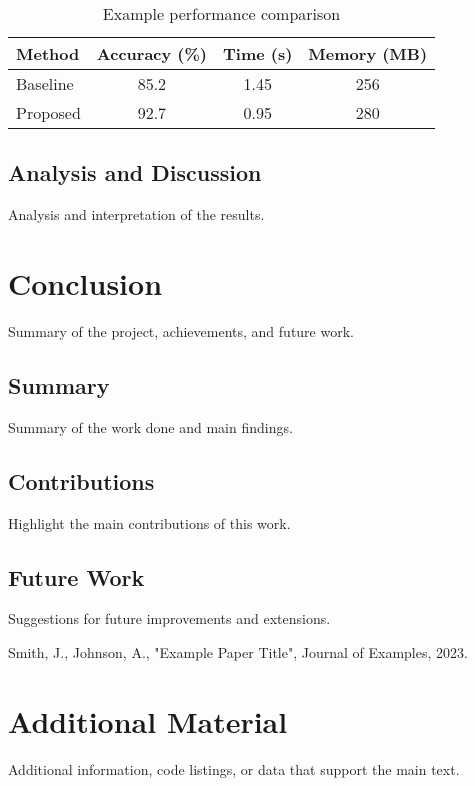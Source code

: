 \documentclass[12pt,a4paper]{report}
\begin{document}
\begin{table}[htbp]
\centering
\caption{Example performance comparison}
\label{tab:results}
\begin{tabular}{@{}lccc@{}}
\toprule
\textbf{Method} & \textbf{Accuracy (\%)} & \textbf{Time (s)} & \textbf{Memory (MB)} \\
\midrule
Baseline & 85.2 & 1.45 & 256 \\
Proposed & 92.7 & 0.95 & 280 \\
\bottomrule
\end{tabular}
\end{table}

\section{Analysis and Discussion}
Analysis and interpretation of the results.

\chapter{Conclusion}

Summary of the project, achievements, and future work.

\section{Summary}
Summary of the work done and main findings.

\section{Contributions}
Highlight the main contributions of this work.

\section{Future Work}
Suggestions for future improvements and extensions.

\clearpage
{}


\begin{thebibliography}{9}
 Smith, J., Johnson, A., "Example Paper Title", Journal of Examples, 2023.
\end{thebibliography}

\appendix
\chapter{Additional Material}
Additional information, code listings, or data that support the main text.
\end{document}
